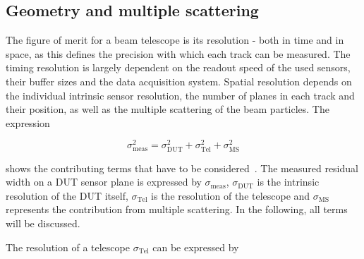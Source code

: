 \subsection{Geometry and multiple scattering}
\label{sec:multiplescattering}

The figure of merit for a beam telescope is its resolution  - both in time and in space, as this defines the precision with which each track can be measured. 
The timing resolution is largely dependent on the readout speed of the used sensors, their buffer sizes and the data acquisition system. 
Spatial resolution depends on the individual intrinsic sensor resolution, the number of planes in each track and their position, as well as the multiple scattering of the beam particles. 
The expression

\begin{equation}
\label{eq:telescoperesolutionequation}
\sigma_{\textrm{meas}}^2 = \sigma_{\textrm{DUT}}^2 + \sigma_{\textrm{Tel}}^2 +
\sigma_{\textrm{MS}}^2
\end{equation}

\noindent shows the contributing terms that have to be considered~\cite{ref:eudetreport200902}. 
The measured residual width on a DUT sensor plane is expressed by $\sigma_{\textrm{meas}}$, $\sigma_{\textrm{DUT}}$ is the intrinsic resolution of the DUT itself,
 $\sigma_{\textrm{Tel}}$ is the resolution of the telescope and $\sigma_{\textrm{MS}}$ represents the contribution from multiple scattering.
In the following, all terms will be discussed.

The resolution of a telescope $\sigma_{\textrm{Tel}}$ can be expressed by

